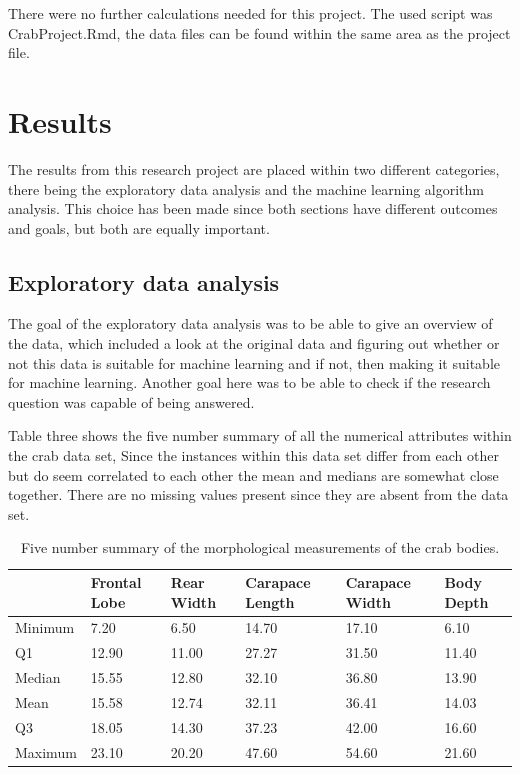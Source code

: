 \documentclass[
]{article}
\begin{document}
There were no further calculations needed for this project. The used
script was CrabProject.Rmd, the data files can be found within the same
area as the project file.

\newpage

\hypertarget{results}{%
\section{Results}\label{results}}

The results from this research project are placed within two different
categories, there being the exploratory data analysis and the machine
learning algorithm analysis. This choice has been made since both
sections have different outcomes and goals, but both are equally
important.

\hypertarget{exploratory-data-analysis}{%
\subsection{Exploratory data analysis}\label{exploratory-data-analysis}}

The goal of the exploratory data analysis was to be able to give an
overview of the data, which included a look at the original data and
figuring out whether or not this data is suitable for machine learning
and if not, then making it suitable for machine learning. Another goal
here was to be able to check if the research question was capable of
being answered.

Table three shows the five number summary of all the numerical
attributes within the crab data set, Since the instances within this
data set differ from each other but do seem correlated to each other the
mean and medians are somewhat close together. There are no missing
values present since they are absent from the data set.

\begin{table}[!h]

\caption{\label{tab:Five number summary of the crab data}Five number summary of the morphological measurements of the crab bodies.}
\centering
\begin{tabular}[t]{l|l|l|l|l|l}
\hline
  & Frontal Lobe & Rear Width & Carapace Length & Carapace Width & Body Depth\\
\hline
Minimum & 7.20 & 6.50 & 14.70 & 17.10 & 6.10\\
\hline
Q1 & 12.90 & 11.00 & 27.27 & 31.50 & 11.40\\
\hline
Median & 15.55 & 12.80 & 32.10 & 36.80 & 13.90\\
\hline
Mean & 15.58 & 12.74 & 32.11 & 36.41 & 14.03\\
\hline
Q3 & 18.05 & 14.30 & 37.23 & 42.00 & 16.60\\
\hline
Maximum & 23.10 & 20.20 & 47.60 & 54.60 & 21.60\\
\hline
\end{tabular}
\end{table}
\end{document}
